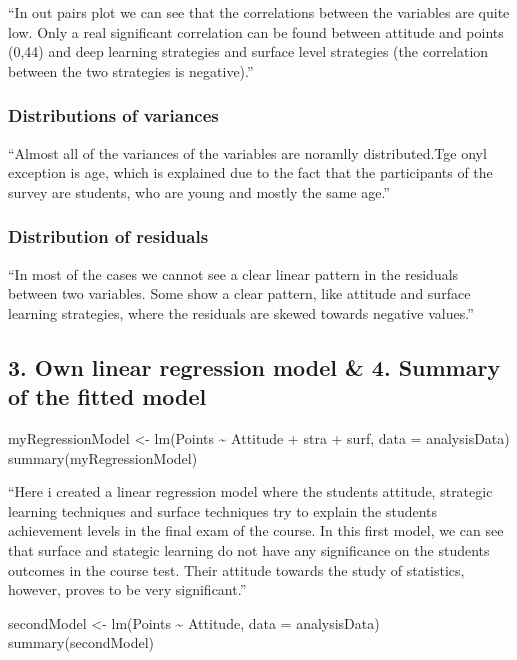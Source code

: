 \documentclass[]{article}
\begin{document}
``In out pairs plot we can see that the correlations between the
variables are quite low. Only a real significant correlation can be
found between attitude and points (0,44) and deep learning strategies
and surface level strategies (the correlation between the two strategies
is negative).''

\hypertarget{distributions-of-variances}{%
\subsubsection{Distributions of
variances}\label{distributions-of-variances}}

``Almost all of the variances of the variables are noramlly
distributed.Tge onyl exception is age, which is explained due to the
fact that the participants of the survey are students, who are young and
mostly the same age.''

\hypertarget{distribution-of-residuals}{%
\subsubsection{Distribution of
residuals}\label{distribution-of-residuals}}

``In most of the cases we cannot see a clear linear pattern in the
residuals between two variables. Some show a clear pattern, like
attitude and surface learning strategies, where the residuals are skewed
towards negative values.''

\hypertarget{own-linear-regression-model-4.-summary-of-the-fitted-model}{%
\subsection{3. Own linear regression model \& 4. Summary of the fitted
model}\label{own-linear-regression-model-4.-summary-of-the-fitted-model}}

myRegressionModel \textless{}- lm(Points \textasciitilde{} Attitude +
stra + surf, data = analysisData) summary(myRegressionModel)

``Here i created a linear regression model where the students attitude,
strategic learning techniques and surface techniques try to explain the
students achievement levels in the final exam of the course. In this
first model, we can see that surface and stategic learning do not have
any significance on the students outcomes in the course test. Their
attitude towards the study of statistics, however, proves to be very
significant.''

secondModel \textless{}- lm(Points \textasciitilde{} Attitude, data =
analysisData) summary(secondModel)
\end{document}
